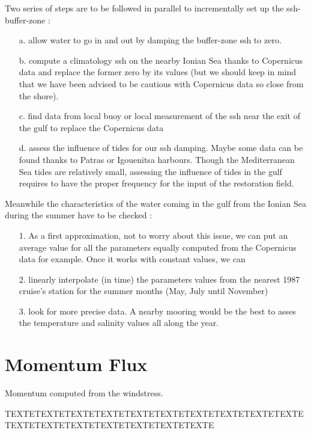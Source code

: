 \documentclass[english]{PFeENSTA}
\begin{document}
{Two series of steps are to be followed in parallel to incrementally set up the ssh-buffer-zone : 
\begin{itemize}
\item [a.] allow water to go in and out by damping the buffer-zone ssh to zero.
\item [b.] compute a climatology ssh on the nearby Ionian Sea thanks to Copernicus data and replace the former zero by its values (but we should keep in mind that we have been advised to be cautious with Copernicus data so close from the shore).
\item [c.] find data from local buoy or local measurement of the ssh near the exit of the gulf to replace the Copernicus data
\item [d.] assess the influence of tides for our ssh damping. Maybe some data can be found thanks to Patras or Igouenitsa harbours. Though the Mediterranean Sea tides are relatively small, assessing the influence of tides in the gulf requires to have the proper frequency for the input of the restoration field. 
 \end{itemize}
 
Meanwhile the characteristics of the water coming in the gulf from the Ionian Sea during the summer have to be checked :
\begin{itemize}
\item[1.] As a first approximation, not to worry about this issue, we can put an average value for all the parameters equally computed from the Copernicus data for example. Once it works with constant values, we can 
\item[2.] linearly interpolate (in time) the parameters values from the nearest 1987 cruise's station for the summer months (May, July until November)
\item[3.] look for more precise data. A nearby mooring would be the best to asses the temperature and salinity values all along the year.
\end{itemize}
  
\section{Momentum Flux}


Momentum computed from the windstress.  

 TEXTETEXTETEXTETEXTETEXTETEXTETEXTETEXTETEXTETEXTETEXTETEXTETEXTETEXTETEXTETEXTETEXTE


}
\end{document}
